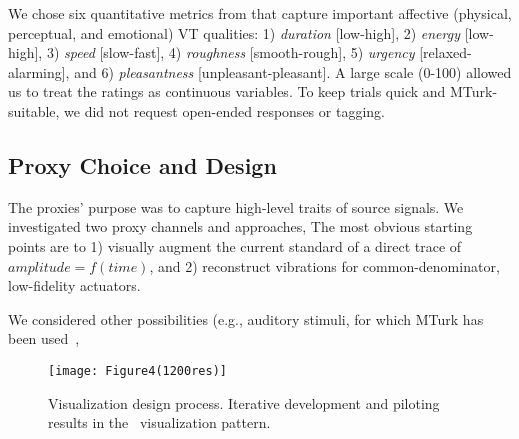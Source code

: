 We chose six quantitative metrics from \cite{Seifi2015} that capture important affective (physical, perceptual, and %
emotional) VT qualities:
 1) \textit{duration} [low-high], 
 2) \textit{energy} [low-high], 
 3) \textit{speed} [slow-fast], 
 4) \textit{roughness} [smooth-rough], 
 5) \textit{urgency} [relaxed-alarming], and 
 6) \textit{pleasantness} [unpleasant-pleasant].
A large scale (0-100) 
allowed us to treat the ratings as continuous variables.
To keep trials quick and MTurk-suitable,
we did not request open-ended responses or tagging. %

\subsection{Proxy Choice and Design}
The proxies' purpose was to capture high-level traits of source signals. 
We investigated two proxy channels and approaches,  %
The most obvious starting points are to 
1) visually augment the current standard of a direct trace of $amplitude=f(time)$, and
2) reconstruct vibrations for common-denominator, low-fidelity actuators.

We considered other possibilities (e.g., auditory stimuli, for which MTurk  has been used~\cite{Cartwright2015},   





    \begin{figure*}
        \centering
        \texttt{[image: Figure4(1200res)]}
        \caption{Visualization design process. Iterative development and piloting results in the \linear~visualization pattern.}
        \label{fig:vis:initialdesigns}
    \end{figure*}
    
